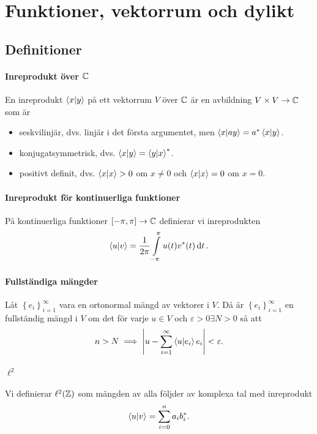 \section{Funktioner, vektorrum och dylikt}

\subsection{Definitioner}

\paragraph{Inreprodukt över $\mathbb{C}$}
En inreprodukt $\bra{x}\ket{y}$ på ett vektorrum $V$ över $\mathbb{C}$ är en avbildning $V\times V\to \mathbb{C}$ som är
\begin{itemize}
	\item seskvilinjär, dvs. linjär i det första argumentet, men $\bra{x}\ket{ay} = a^{*}\bra{x}\ket{y}$.
	\item konjugatsymmetrisk, dvs. $\bra{x}\ket{y} = \bra{y}\ket{x}^{*}$.
	\item positivt definit, dvs. $\bra{x}\ket{x} > 0$ om $x \neq 0$ och $\bra{x}\ket{x} = 0$ om $x = 0$.
\end{itemize}

\paragraph{Inreprodukt för kontinuerliga funktioner}
På kontinuerliga funktioner $[-\pi, \pi] \to \mathbb{C}$ definierar vi inreprodukten
\begin{align*}
	\bra{u}\ket{v} = \frac{1}{2\pi}\int\limits_{-\pi}^{\pi}u(t)v^{*}(t)\dd{t}.
\end{align*}

\paragraph{Fullständiga mängder}
Låt $\left\{e_{i}\right\}_{i = 1}^{\infty}$ vara en ortonormal mängd av vektorer i $V$. Då är $\left\{e_{i}\right\}_{i = 1}^{\infty}$ en fullständig mängd i $V$ om det för varje $u\in V$ och $\varepsilon >0 \exists N >0$ så att
\begin{align*}
	n > N\implies \abs{u - \sum\limits_{i = 1}^{\infty}\bra{u}\ket{e_{i}}e_{i}} < \varepsilon.
\end{align*}

\paragraph{$\ell^{2}$}
Vi definierar $\ell^{2}(\mathbb{Z})$ som mängden av alla följder av komplexa tal med inreprodukt
\begin{align*}
	\bra{u}\ket{v} = \sum\limits_{i = 0}^{n}a_{i}b_{i}^{*}.
\end{align*}


